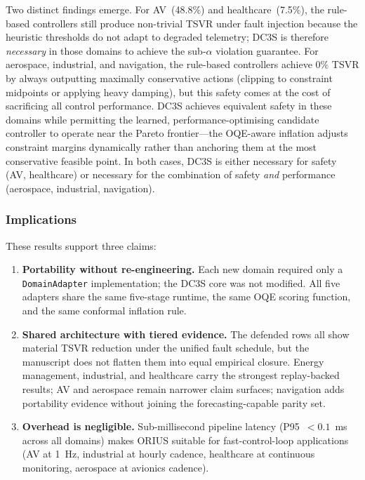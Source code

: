 Two distinct findings emerge.  For AV~(48.8\%) and healthcare~(7.5\%),
the rule-based controllers still produce non-trivial TSVR under fault
injection because the heuristic thresholds do not adapt to degraded
telemetry; DC3S is therefore \emph{necessary} in those domains to achieve
the sub-$\alpha$ violation guarantee.  For aerospace, industrial, and
navigation, the rule-based controllers achieve 0\% TSVR by always
outputting maximally conservative actions (clipping to constraint
midpoints or applying heavy damping), but this safety comes at the cost
of sacrificing all control performance.  DC3S achieves equivalent safety
in these domains while permitting the learned, performance-optimising
candidate controller to operate near the Pareto frontier---the
OQE-aware inflation adjusts constraint margins dynamically rather than
anchoring them at the most conservative feasible point.  In both cases,
DC3S is either necessary for safety (AV, healthcare) or necessary for
the combination of safety \emph{and} performance (aerospace, industrial,
navigation).

\subsubsection{Implications}

These results support three claims:

\begin{enumerate}
  \item \textbf{Portability without re-engineering.} Each new domain required
    only a \texttt{DomainAdapter} implementation; the DC3S core was not
    modified.  All five adapters share the same five-stage runtime, the same
    OQE scoring function, and the same conformal inflation rule.
  \item \textbf{Shared architecture with tiered evidence.} The defended rows
    all show material TSVR reduction under the unified fault schedule, but the
    manuscript does not flatten them into equal empirical closure.  Energy
    management, industrial, and healthcare carry the strongest replay-backed
    results; AV and aerospace remain narrower claim surfaces; navigation adds
    portability evidence without joining the forecasting-capable parity set.
  \item \textbf{Overhead is negligible.} Sub-millisecond pipeline latency
    (P95~$<\!0.1$~ms across all domains) makes ORIUS suitable for
    fast-control-loop applications (AV at 1~Hz, industrial at hourly cadence,
    healthcare at continuous monitoring, aerospace at avionics cadence).
\end{enumerate}

